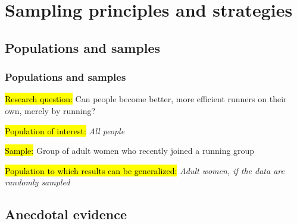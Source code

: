 \documentclass[slidestop,compress,mathserif]{beamer}
\newcommand{\soln}[1]{\textit{#1}}
\begin{document}
\section{Sampling principles and strategies}


\subsection{Populations and samples}


\begin{frame}
\frametitle{Populations and samples}

{
\hl{Research question:} Can people become better, more efficient runners on their own, merely by running? \\

\pause 

\hl{Population of interest:} \soln{\pause All people}
}
\pause 
$\:$ \\
\hl{Sample:} Group of adult women who recently joined a running group

\pause

\hl{Population to which results can be generalized:} \soln{\pause Adult women, if the data are randomly sampled}

\end{frame}


\subsection{Anecdotal evidence}

\end{document}
